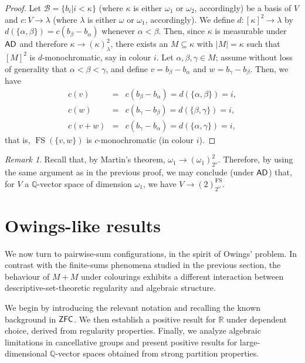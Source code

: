 \documentclass{amsart}
\theoremstyle{definition}
\newcommand{\ad}{\mathnormal{\mathsf{AD}}}
\newcommand{\zfc}{\mathnormal{\mathsf{ZFC}}}
\theoremstyle{remark}
\newtheorem{remark}[theorem]{Remark}
\numberwithin{equation}{section}
\begin{document}
    \begin{proof}
        Let $\mathcal{B}=\{b_{i}|i<\kappa\}$ (where $\kappa$ is either $\omega_1$ or $\omega_2$, accordingly) be a basis of $V$ and $c:V\to\lambda$ (where $\lambda$ is either $\omega$ or $\omega_1$, accordingly). We define $d:[\kappa]^{2}\to\lambda$ by $d(\{\alpha,\beta\})=c(b_{\beta}-b_{\alpha})$ whenever $\alpha<\beta$. Then, since $\kappa$ is measurable under $\ad$ and therefore $\kappa\longrightarrow(\kappa)_\lambda^2$, there exists an $M\subseteq\kappa$ with $|M|=\kappa$ such that $[M]^2$ is $d$-monochromatic, say in colour $i$. Let $\alpha,\beta,\gamma\in M$; assume without loss of generality that $\alpha<\beta<\gamma$, and define $v=b_\beta-b_\alpha$ and $w=b_\gamma-b_\beta$. Then, we have
        \begin{eqnarray*}
            c(v)&=&c(b_{\beta}-b_{\alpha})=d(\{\alpha,\beta\})=i,\\
            c(w)&=& c(b_\gamma-b_\beta)=d(\{\beta,\gamma\})=i,\\
            c(v+w)&=& c(b_{\gamma}-b_{\alpha})=d(\{\alpha,\gamma\})=i,
        \end{eqnarray*}
        that is, $\operatorname{FS}(\{v,w\})$ is $c$-monochromatic (in colour $i$).
    \end{proof}
    
    \begin{remark} \label{rem:hindman-omega2}
        Recall that, by Martin's theorem, $\omega_1\to(\omega_1)_{2^\omega}^2$. Therefore, by using the same argument as in the previous proof, we may conclude (under $\ad$) that, for $V$ a $\mathbb Q$-vector space of dimension $\omega_1$, we have $V\to(2)^{\operatorname{FS}}_{2^\omega}$.
    \end{remark}
   

\section{Owings-like results}\label{sec:owings}

We now turn to pairwise-sum configurations, in the spirit of Owings’ problem. 
In contrast with the finite-sums phenomena studied in the previous section, the behaviour of $M+M$ under colourings exhibits a different interaction between descriptive-set-theoretic regularity and algebraic structure.

We begin by introducing the relevant notation and recalling the known background in $\zfc$. 
We then establish a positive result for $\mathbb{R}$ under dependent choice, derived from regularity properties. 
Finally, we analyze algebraic limitations in cancellative groups and present positive results for large-dimensional $\mathbb{Q}$-vector spaces obtained from strong partition properties.
\end{document}
